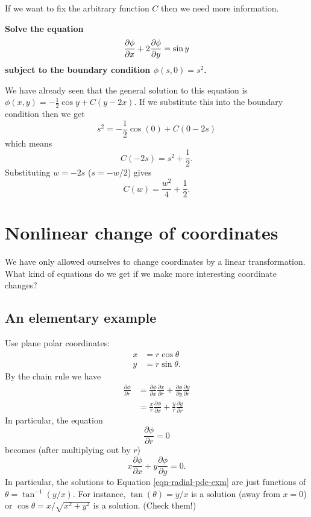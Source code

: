 If we want to fix the arbitrary function $C$ then we need more information.

\begin{exm}
{\bf Solve the equation
\[\frac{\partial \phi}{\partial x}+2\frac{\partial \phi}{\partial y}=\sin y\]
subject to the boundary condition $\phi(s,0)=s^2$.}

We have already seen that the general solution to this equation is $\phi(x,y)=-\frac{1}{2}\cos y+C(y-2x)$. If we substitute this into the boundary condition then we get
\[s^2=-\frac{1}{2}\cos(0)+C(0-2s)\]
which means
\[C(-2s)=s^2+\frac{1}{2}.\]
Substituting $w=-2s$ ($s=-w/2$) gives
\[C(w)=\frac{w^2}{4}+\frac{1}{2}.\]
\end{exm}

\section{Nonlinear change of coordinates}

We have only allowed ourselves to change coordinates by a linear transformation. What kind of equations do we get if we make more interesting coordinate changes?

\subsection{An elementary example}

\begin{exm}
Use plane polar coordinates:
\begin{align*}
x&=r\cos\theta\\
y&=r\sin\theta.
\end{align*}
By the chain rule we have
\begin{align*}
\frac{\partial\phi}{\partial r}&=\frac{\partial\phi}{\partial x}\frac{\partial x}{\partial r}+\frac{\partial\phi}{\partial y}\frac{\partial y}{\partial r}\\
&=\frac{x}{r}\frac{\partial\phi}{\partial x}+\frac{y}{r}\frac{\partial y}{\partial r}
\end{align*}
In particular, the equation
\[\frac{\partial\phi}{\partial r}=0\]
becomes (after multiplying out by $r$)
\begin{equation}\label{eqn-radial-pde-exm}x\frac{\partial\phi}{\partial x}+y\frac{\partial\phi}{\partial y}=0.\end{equation}
In particular, the solutions to Equation \eqref{eqn-radial-pde-exm} are just functions of $\theta=\tan^{-1}(y/x)$. For instance, $\tan(\theta)=y/x$ is a solution (away from $x=0$) or $\cos\theta=x/\sqrt{x^2+y^2}$ is a solution. (Check them!)
\end{exm}

